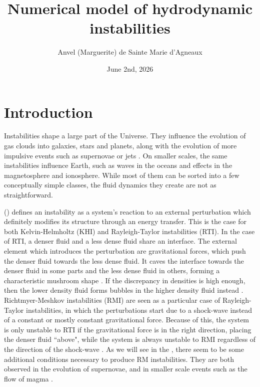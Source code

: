 \documentclass[a4paper,12pt]{article}
\title{Numerical model of hydrodynamic instabilities}
\author{Anvel (Marguerite) de Sainte Marie d'Agneaux}
\date{June 2nd, 2026}
\begin{document}
\maketitle

\section{Introduction}
\label{sec:intro}
Instabilities shape a large part of the Universe. They influence the evolution of gas clouds into galaxies, stars and planets, along with the evolution of more impulsive events such as supernovae or jets \parencite{zhou_rayleightaylor_2021}. On smaller scales, the same instabilities influence Earth, such as waves in the oceans and effects in the magnetosphere and ionosphere. While most of them can be sorted into a few conceptually simple classes, the fluid dynamics they create are not as straightforward.

\citeauthor{trussoni_kelvinhelmholtz_2008} () defines an instability as a system's reaction to an external perturbation which definitely modifies its structure through an energy transfer. This is the case for both Kelvin-Helmholtz (KHI) and Rayleigh-Taylor instabilities (RTI). In the case of RTI, a denser fluid and a less dense fluid share an interface. The external element which introduces the perturbation are gravitational forces, which push the denser fluid towards the less dense fluid. It caves the interface towards the denser fluid in some parts and the less dense fluid in others, forming a characteristic mushroom shape \parencite{zhou_rayleightaylor_2021}. If the discrepancy in densities is high enough, then the lower density fluid forms bubbles in the higher density fluid instead \parencite{zhou_rayleightaylor_2021}. Richtmyer-Meshkov instabilities (RMI) are seen as a particular case of Rayleigh-Taylor instabilities, in which the perturbations start due to a shock-wave instead of a constant or mostly constant gravitational force. Because of this, the system is only unstable to RTI if the gravitational force is in the right direction, placing the denser fluid ``above", while the system is always unstable to RMI regardless of the direction of the shock-wave \parencite{zhou_rayleightaylor_2021}. As we will see in the , there seem to be some additional conditions necessary to produce RM instabilities. They are both observed in the evolution of supernovae, and in smaller scale events such as the flow of magma \parencite{zhou_rayleightaylor_2021}.
\end{document}
